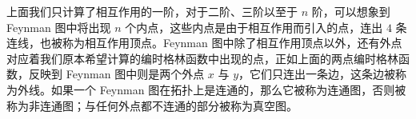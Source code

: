 上面我们只计算了相互作用的一阶，对于二阶、三阶以至于 $n$ 阶，可以想象到 Feynman 图中将出现 $n$ 个内点，这些内点是由于相互作用而引入的点，连出 $4$ 条连线，也被称为相互作用顶点。Feynman 图中除了相互作用顶点以外，还有外点对应着我们原本希望计算的编时格林函数中出现的点，正如上面的两点编时格林函数，反映到 Feynman 图中则是两个外点 $x$ 与 $y$，它们只连出一条边，这条边被称为外线。如果一个 Feynman 图在拓扑上是连通的，那么它被称为连通图，否则被称为非连通图；与任何外点都不连通的部分被称为真空图。